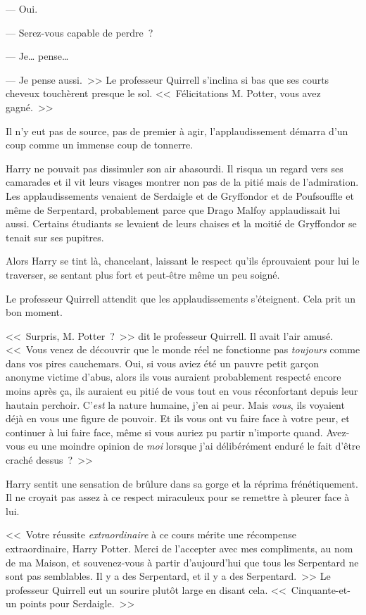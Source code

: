 --- Oui.

--- Serez-vous capable de perdre~?

--- Je… pense…

--- Je pense aussi.~>> Le professeur Quirrell s'inclina si bas que ses courts cheveux touchèrent presque le sol. <<~Félicitations M. Potter, vous avez gagné.~>>

Il n'y eut pas de source, pas de premier à agir, l'applaudissement démarra d'un coup comme un immense coup de tonnerre.

Harry ne pouvait pas dissimuler son air abasourdi. Il risqua un regard vers ses camarades et il vit leurs visages montrer non pas de la pitié mais de l'admiration. Les applaudissements venaient de Serdaigle et de Gryffondor et de Poufsouffle et même de Serpentard, probablement parce que Drago Malfoy applaudissait lui aussi. Certains étudiants se levaient de leurs chaises et la moitié de Gryffondor se tenait sur ses pupitres.

Alors Harry se tint là, chancelant, laissant le respect qu'ils éprouvaient pour lui le traverser, se sentant plus fort et peut-être même un peu soigné.

Le professeur Quirrell attendit que les applaudissements s'éteignent. Cela prit un bon moment.

<<~Surpris, M. Potter~?~>> dit le professeur Quirrell. Il avait l'air amusé. <<~Vous venez de découvrir que le monde réel ne fonctionne pas \emph{toujours} comme dans vos pires cauchemars. Oui, si vous aviez été un pauvre petit garçon anonyme victime d'abus, alors ils vous auraient probablement respecté encore moins après ça, ils auraient eu pitié de vous tout en vous réconfortant depuis leur hautain perchoir. C'\emph{est} la nature humaine, j'en ai peur. Mais \emph{vous}, ils voyaient déjà en vous une figure de pouvoir. Et ils vous ont vu faire face à votre peur, et continuer à lui faire face, même si vous auriez pu partir n'importe quand. Avez-vous eu une moindre opinion de \emph{moi} lorsque j'ai délibérément enduré le fait d'être craché dessus~?~>>

Harry sentit une sensation de brûlure dans sa gorge et la réprima frénétiquement. Il ne croyait pas assez à ce respect miraculeux pour se remettre à pleurer face à lui.

<<~Votre réussite \emph{extraordinaire} à ce cours mérite une récompense extraordinaire, Harry Potter. Merci de l'accepter avec mes compliments, au nom de ma Maison, et souvenez-vous à partir d'aujourd'hui que tous les Serpentard ne sont pas semblables. Il y a des Serpentard, et il y a des Serpentard.~>> Le professeur Quirrell eut un sourire plutôt large en disant cela. <<~Cinquante-et-un points pour Serdaigle.~>>

